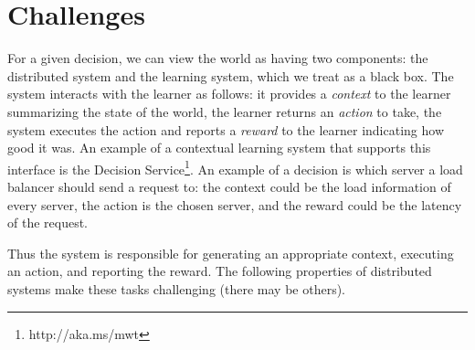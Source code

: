 \documentclass[letterpaper,twocolumn]{article}
\newcommand{\ignore}[1]{}
\begin{document}
\section{Challenges}

\ignore{We consider classic decisions made by distributed systems where the
choice of action is discrete, such as: where to route a request, how many replicas to
place (and where), or when to raise an alarm during failures.}

For a given decision, we can view the world as having two components: the
distributed system and the learning system, which we treat as a black box.  The
system interacts with the learner as follows: it provides a {\em context}
to the learner summarizing the state of the world, the learner returns 
an {\em action} to take, the system executes the action and reports a {\em
reward} to the learner indicating how good it was.  An example of a
contextual learning system that supports this interface is the Decision
Service\footnote{http://aka.ms/mwt}.  An example of a decision is which
server a load balancer should send a request to: the context could be the load
information of every server, the action is the chosen server, and
the reward could be the latency of the request.

\ignore{
We separate the world into a As mentioned earlier, we
adopt the framework of contextual online learning with partial feedback.  To separate the systems concerns we are trying to highlight
from machine learning concerns, we abstract the learning system as a black-box
and assume it provides optimal decisions with zero latency. For a given decision
over a discrete action space, the interface to the learning system is as
follows: given a {\em context} that summarizes the state of the world, the
learning system chooses an {\em action} to take, which our system does and later
reports a {\em reward} indicating how good the action was. An example of a
learning system that supports this interface is the Decision
Service~\footnote{http://aka.ms/mwt}. Now consider a load balancer using that
learning system to make its request-routing decisions. The context for each
decision could be load information of each machine in the cluster, the action
could be a specific machine to route the request to, and the reward could be the
latency of processing the request.
}

Thus the system is responsible for generating an appropriate context, executing
an action, and reporting the reward.  The following properties of distributed
systems make these tasks challenging (there may be others).
\end{document}
